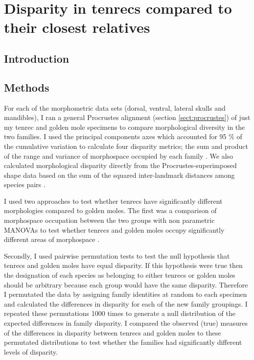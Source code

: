 \chapter{Disparity in tenrecs compared to their closest relatives}
\label{chap:disparity}

\section{Introduction}

\section{Methods}

	For each of the morphometric data sets (dorsal, ventral, lateral skulls and mandibles), I ran a general Procrustes alignment (section \ref{sect:procrustes}) of just my tenrec and golden mole specimens to compare morphological diversity in the two families. I used the principal components axes which accounted for 95 \% of the cumulative variation to calculate four disparity metrics; the sum and product of the range and variance of morphospace occupied by each family \citep{Brusatte2008, Foth2012, Ruta2013}. We also calculated morphological disparity directly from the Procrustes-superimposed shape data based on the sum of the squared inter-landmark distances among species pairs \citep[SSqDist,][]{Zelditch2012}.
	
	I used two approaches to test whether tenrecs have significantly different morphologies compared to golden moles. The first was a comparison of morphospace occupation between the two groups with non parametric MANOVAs \citep{Anderson2001} to test whether tenrecs and golden moles occupy significantly different areas of morphospace \citep[e.g][]{Serb2011, Ruta2013}. 
	
	Secondly, I used pairwise permutation tests to test the null hypothesis that tenrecs and golden moles have equal disparity. If this hypothesis were true then the designation of each species as belonging to either tenrecs or golden moles should be arbitrary because each group would have the same disparity. Therefore I permutated the data by assigning family identities at random to each specimen and calculated the differences in disparity for each of the new family groupings. I repeated these permutations 1000 times to generate a null distribution of the expected differences in family disparity. I compared the observed (true) measures of the differences in disparity between tenrecs and golden moles to these permutated distributions to test whether the families had significantly different levels of disparity.

